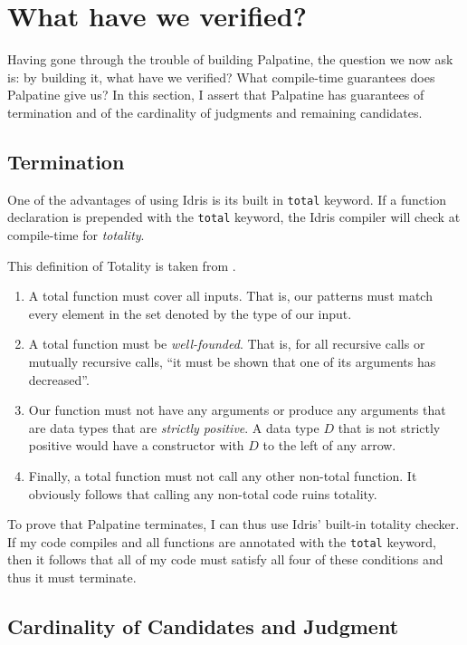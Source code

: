 \chapter{What have we verified?}

Having gone through the trouble of building Palpatine, the question we
now ask is: by building it, what have we verified? What compile-time guarantees
does Palpatine give us? In this section, I assert that Palpatine has
guarantees of termination and of the cardinality of judgments and remaining
candidates. 

\section{Termination}

One of the advantages of using Idris is its built in \texttt{total} keyword. If
a function declaration is prepended with the \texttt{total} keyword, the Idris
compiler will check at compile-time for \textit{totality}. 

This definition of Totality is taken from \cite{tdd_book}. 
\begin{enumerate}
    \item A total function must cover all inputs. That is, our patterns must
    match every element in the set denoted by the type of our input.
    \item A total function must be \textit{well-founded}. That is, for all
    recursive calls or mutually recursive calls, ``it must be shown that one of
    its arguments has decreased''. 
    \item Our function must not have any arguments or produce any arguments that
    are data types that are \textit{strictly positive}. A data type $D$ that is
    not strictly positive would have a constructor with $D$ to the left of any
    arrow. 
    \item Finally, a total function must not call any other non-total function.
    It obviously follows that calling any non-total code ruins totality. 
\end{enumerate}

To prove that Palpatine terminates, I can thus use Idris' built-in
totality checker. If my code compiles and all functions are annotated with the
\texttt{total} keyword, then it follows that all of my code must satisfy all
four of these conditions and thus it must terminate. 

\section{Cardinality of Candidates and Judgment}


